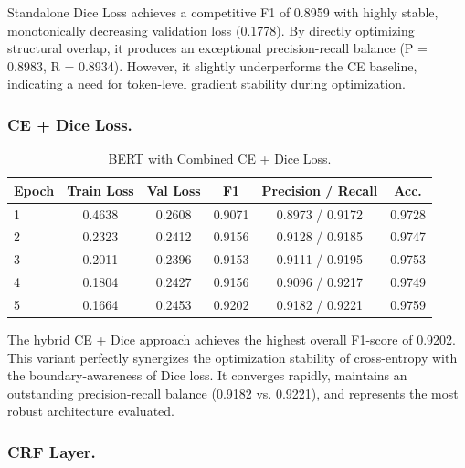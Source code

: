 \noindent Standalone Dice Loss achieves a competitive F1 of 0.8959 with highly stable, monotonically decreasing validation loss (0.1778). By directly optimizing structural overlap, it produces an exceptional precision-recall balance (P = 0.8983, R = 0.8934). However, it slightly underperforms the CE baseline, indicating a need for token-level gradient stability during optimization.

\subsubsection{CE + Dice Loss.}

\begin{table}[htbp]
    \centering
    \begin{tabular}{l c c c c c}
        \hline
        \textbf{Epoch} & \textbf{Train Loss} & \textbf{Val Loss} & \textbf{F1} & \textbf{Precision / Recall} & \textbf{Acc.} \\
        \hline
        1 & 0.4638 & 0.2608 & 0.9071 & 0.8973 / 0.9172 & 0.9728 \\
        2 & 0.2323 & 0.2412 & 0.9156 & 0.9128 / 0.9185 & 0.9747 \\
        3 & 0.2011 & 0.2396 & 0.9153 & 0.9111 / 0.9195 & 0.9753 \\
        4 & 0.1804 & 0.2427 & 0.9156 & 0.9096 / 0.9217 & 0.9749 \\
        5 & 0.1664 & 0.2453 & 0.9202 & 0.9182 / 0.9221 & 0.9759 \\
        \hline
    \end{tabular}
    \caption{BERT with Combined CE + Dice Loss.}
    \label{tab:bert_ce_dice}
\end{table}

\noindent The hybrid CE + Dice approach achieves the highest overall F1-score of 0.9202. This variant perfectly synergizes the optimization stability of cross-entropy with the boundary-awareness of Dice loss. It converges rapidly, maintains an outstanding precision-recall balance (0.9182 vs. 0.9221), and represents the most robust architecture evaluated.

\subsubsection{CRF Layer.}

